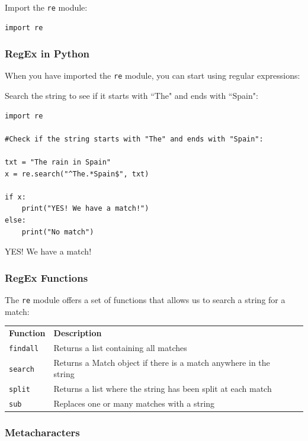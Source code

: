 \documentclass[12pt,a4paper]{article}
\newcommand{\code}[1]{%
	\colorbox{backcolour}{\lstinline{#1}}%
}
\newcommand{\lcode}[1]{%
	\lstinline{#1}%
}
\newcommand{\tcol}[2]{%
	\quad #1 & #2 \\
}
\begin{document}
Import the \code{re} module:

\begin{lstlisting}
import re
\end{lstlisting}

\subsubsection{RegEx in Python}

When you have imported the \code{re} module, you can start using regular
expressions:

\begin{ebox}
Search the string to see if it starts with ``The" and ends with ``Spain":
	\begin{lstlisting}
import re

#Check if the string starts with "The" and ends with "Spain":

txt = "The rain in Spain"
x = re.search("^The.*Spain$", txt)

if x:
    print("YES! We have a match!")
else:
    print("No match")
	\end{lstlisting}
\tcblower
	\begin{vercode}
YES! We have a match!
	\end{vercode}
\end{ebox}
\subsubsection{RegEx Functions}

The \code{re} module offers a set of functions that allows us to search a string for a match:

\begin{table}[h]
	\begin{center}
		\begin{tabularx}{.8\textwidth}{lXl}
\tcol{\textbf{Function}}{\textbf{Description}}
\tcol{\lcode{findall}}{Returns a list containing all matches}
\tcol{\lcode{search}}{Returns a Match object if there is a match anywhere in the string}
\tcol{\lcode{split}}{Returns a list where the string has been split at each match}
\tcol{\lcode{sub}}{Replaces one or many matches with a string}
		\end{tabularx}
	\end{center}
\end{table}
\subsubsection{Metacharacters}
\end{document}

